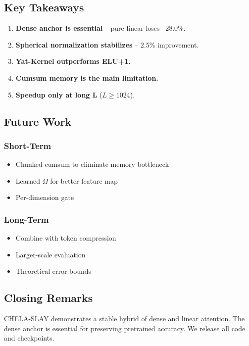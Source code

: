 \subsection{Key Takeaways}

\begin{enumerate}
\item \textbf{Dense anchor is essential} -- pure linear loses ~28.0\%.
\item \textbf{Spherical normalization stabilizes} -- 2.5\% improvement.
\item \textbf{Yat-Kernel outperforms ELU+1.}
\item \textbf{Cumsum memory is the main limitation.}
\item \textbf{Speedup only at long L} ($L \geq 1024$).

\end{enumerate}
\subsection{Future Work}

\subsubsection{Short-Term}
\begin{itemize}
\item Chunked cumsum to eliminate memory bottleneck
\item Learned $\Omega$ for better feature map
\item Per-dimension gate

\end{itemize}
\subsubsection{Long-Term}
\begin{itemize}
\item Combine with token compression
\item Larger-scale evaluation
\item Theoretical error bounds

\end{itemize}
\subsection{Closing Remarks}

CHELA-SLAY demonstrates a stable hybrid of dense and linear attention. The 
dense anchor is essential for preserving pretrained accuracy. We release all 
code and checkpoints.

